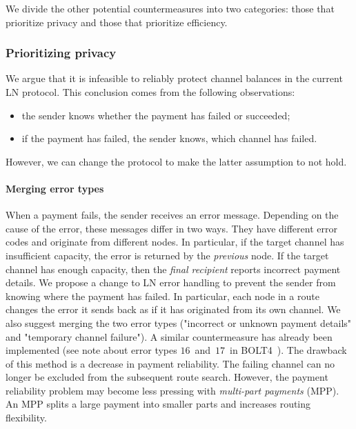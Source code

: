We divide the other potential countermeasures into two categories: those that prioritize privacy and those that prioritize efficiency.


\subsubsection*{Prioritizing privacy}

We argue that it is infeasible to reliably protect channel balances in the current LN protocol.
This conclusion comes from the following observations:
\begin{itemize}
	\item the sender knows whether the payment has failed or succeeded;
	\item if the payment has failed, the sender knows, which channel has failed.
\end{itemize}
However, we can change the protocol to make the latter assumption to not hold.

\paragraph{Merging error types}
When a payment fails, the sender receives an error message.
Depending on the cause of the error, these messages differ in two ways.
They have different error codes and originate from different nodes.
In particular, if the target channel has insufficient capacity, the error is returned by the \textit{previous} node.
If the target channel has enough capacity, then the \textit{final recipient} reports incorrect payment details.
We propose a change to LN error handling to prevent the sender from knowing where the payment has failed.
In particular, each node in a route changes the error it sends back as if it has originated from its own channel.
We also suggest merging the two error types ("incorrect or unknown payment details" and "temporary channel failure").
A similar countermeasure has already been implemented (see note about error types $16$~and~$17$~in BOLT4~\cite{Bolt4OnionRouting}).
The drawback of this method is a decrease in payment reliability.
The failing channel can no longer be excluded from the subsequent route search.
However, the payment reliability problem may become less pressing with \textit{multi-part payments} (MPP).
An MPP splits a large payment into smaller parts and increases routing flexibility.

